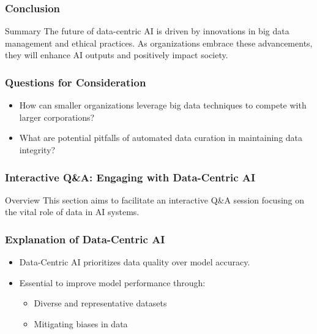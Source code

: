 \documentclass[aspectratio=169]{beamer}
\begin{document}
\begin{frame}[fragile]
    \frametitle{Conclusion}
    \begin{block}{Summary}
        The future of data-centric AI is driven by innovations in big data management and ethical practices. As organizations embrace these advancements, they will enhance AI outputs and positively impact society.
    \end{block}
\end{frame}

\begin{frame}[fragile]
    \frametitle{Questions for Consideration}
    \begin{itemize}
        \item How can smaller organizations leverage big data techniques to compete with larger corporations?
        \item What are potential pitfalls of automated data curation in maintaining data integrity?
    \end{itemize}
\end{frame}

\begin{frame}[fragile]
    \frametitle{Interactive Q\&A: Engaging with Data-Centric AI}
    \begin{block}{Overview}
        This section aims to facilitate an interactive Q\&A session focusing on the vital role of data in AI systems.
    \end{block}
\end{frame}

\begin{frame}[fragile]
    \frametitle{Explanation of Data-Centric AI}
    \begin{itemize}
        \item Data-Centric AI prioritizes data quality over model accuracy.
        \item Essential to improve model performance through:
        \begin{itemize}
            \item Diverse and representative datasets
            \item Mitigating biases in data
        \end{itemize}
    \end{itemize}
\end{frame}
\end{document}

